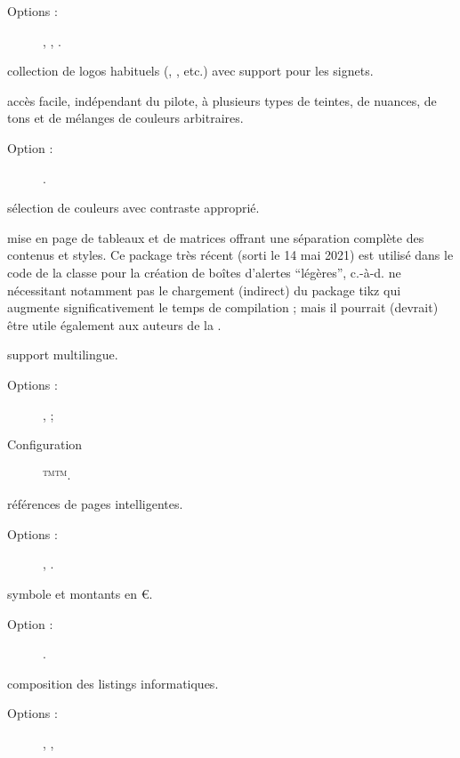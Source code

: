 \documentclass{letgut}
\begin{document}
\begin{ctannews}
\begin{description}
  \item[Options :] , ,
    .
  \end{description}
\item[hologo] collection de logos habituels (, ,
  etc.) avec support pour les signets.
\item[xcolor] accès facile, indépendant du pilote, à plusieurs types de teintes,
  de nuances, de tons et de mélanges de couleurs arbitraires.
  \begin{description}
  \item[Option :] .
  \end{description}
\item[ninecolors] sélection de couleurs avec contraste \wcag{} approprié.
\item[tabularray] mise en page de tableaux et de matrices offrant une séparation
  complète des contenus et styles. Ce package très récent (sorti le 14 mai 2021)
  est utilisé dans le code de la classe pour la création de boîtes d'alertes
  \enquote{légères}, c.-à-d. ne nécessitant notamment pas le chargement
  (indirect) du package \ac{tikz} qui augmente significativement le temps de
  compilation ; mais il pourrait (devrait) être utile également aux auteurs de
  la .
\item[babel] support multilingue.
  \begin{description}
  \item[Options :] ,  ;
  \item[Configuration] ™\renewcommand*\frenchtablename{Tableau}™.
  \end{description}
\item[varioref] références de pages intelligentes.
  \begin{description}
  \item[Options :] , .
  \end{description}
\item[eurosym] symbole et montants en \euro{}.
  \begin{description}
  \item[Option :] .
  \end{description}
\item[listings] composition des listings informatiques.
  \begin{description}
  \item[Options :] , ,

\end{description}
\end{ctannews}
\end{document}

